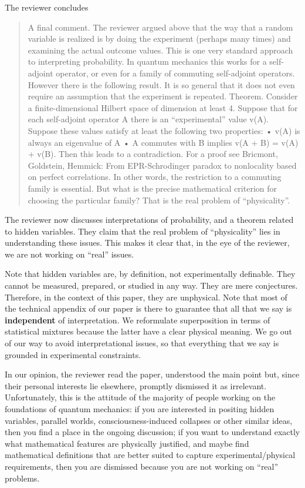 \documentclass[11pt, executivepaper]{article}
\begin{document}
The reviewer concludes
\begin{quote}
A final comment. The reviewer argued above that the way that a random
variable is realized is by doing the experiment (perhaps many times) and examining
the actual outcome values. This is one very standard approach to
interpreting probability.
In quantum mechanics this works for a self-adjoint operator, or even for
a family of commuting self-adjoint operators. However there is the following
result. It is so general that it does not even require an assumption that the
experiment is repeated.
Theorem. Consider a finite-dimensional Hilbert space of dimension at least
4. Suppose that for each self-adjoint operator A there is an “experimental”
value v(A). Suppose these values satisfy at least the following two properties:
• v(A) is always an eigenvalue of A
• A commutes with B implies v(A + B) = v(A) + v(B).
Then this leads to a contradiction. For a proof see Bricmont, Goldstein,
Hemmick: From EPR-Schrodinger paradox to nonlocality based on perfect correlations.
In other words, the restriction to a commuting family is essential. But what
is the precise mathematical criterion for choosing the particular family? That
is the real problem of “physicality”.
\end{quote}
The reviewer now discusses interpretations of probability, and a theorem related to hidden variables. They claim that the real problem of ``physicality'' lies in understanding these issues. This makes it clear that, in the eye of the reviewer, we are not working on ``real'' issues.

Note that hidden variables are, by definition, not experimentally definable. They cannot be measured, prepared, or studied in any way. They are mere conjectures. Therefore, in the context of this paper, they are unphysical. Note that most of the technical appendix of our paper is there to guarantee that all that we say is \textbf{independent} of interpretation. We reformulate superposition in terms of statistical mixtures because the latter have a clear physical meaning. We go out of our way to avoid interpretational issues, so that everything that we say is grounded in experimental constraints.

In our opinion, the reviewer read the paper, understood the main point but, since their personal interests lie elsewhere, promptly dismissed it as irrelevant. Unfortunately, this is the attitude of the majority of people working on the foundations of quantum mechanics: if you are interested in positing hidden variables, parallel worlds, consciousness-induced collapses or other similar ideas, then you find a place in the ongoing discussion; if you want to understand exactly what mathematical features are physically justified, and maybe find mathematical definitions that are better suited to capture experimental/physical requirements, then you are dismissed because you are not working on ``real'' problems. 
\end{document}
